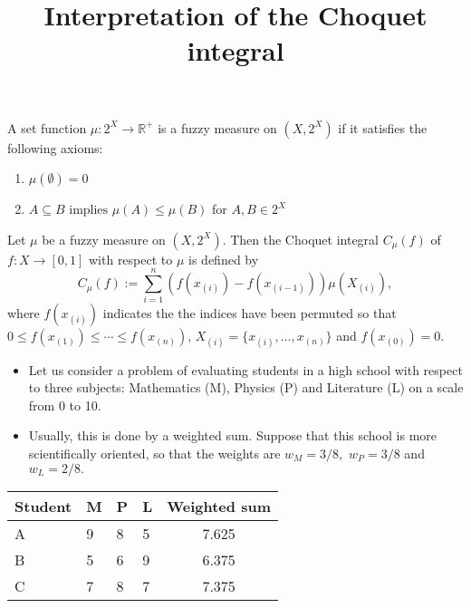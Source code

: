 \documentclass[envcountsect]{beamer}
\begin{document}
\begin{frame}
\begin{definition}
A set function $\mu:2^{X} \rightarrow \mathbb{R}^+$ is a fuzzy measure on $(X, 2^X)$ if it satisfies the following axioms:

\begin{enumerate}
\item $\mu(\emptyset) =0$ \\
\item $A \subseteq B \text{ implies } \mu(A) \leq \mu(B)$ for $A,B \in 2^X$
\end{enumerate}

\end{definition}
\end{frame}

\begin{frame}
\begin{definition}
Let $\mu$ be a fuzzy measure on $(X,2^X)$. Then the Choquet integral $C_{\mu}(f)$ of $f: X \rightarrow [0,1]$ with respect to $\mu$ is defined by
$$
C_{\mu}(f) := \sum_{i=1}^n (f(x_{(i)}) - f(x_{(i-1)}))\mu(X_{(i)}),
$$
where $ f(x_{(i)})$ indicates the the indices have been permuted so that
$ 0 \leq f(x_{(1)}) \leq \cdots \leq f(x_{(n)})$, $X_{(i)} = \{x_{(i)}, \dots ,x_{(n)}\}$ and $f(x_{(0)})=0.$
\end{definition}
\end{frame}

\begin{frame}
\title{Interpretation of the Choquet integral}
\begin{itemize}
\item Let us consider a problem of evaluating students in a high school with respect to three subjects: Mathematics (M), Physics (P) and Literature (L) on a scale from 0 to 10. \\
\item Usually, this is done by a weighted sum. Suppose that this school is more scientifically oriented, so that the weights are $w_M = 3/8,$ $w_P=3/8$ and $w_L=2/8.$
\end{itemize}
\begin{table}[]
\begin{tabular}{llllc}
\hline
Student  & M & P & L & Weighted sum \\
 \hline
 A & 9 & 8 & 5 &  7.625\\
 B & 5 & 6 & 9 &  6.375\\
 C & 7 & 8 & 7 &  7.375\\
 \hline
\end{tabular}

\end{table}
\end{frame}
\end{document}
